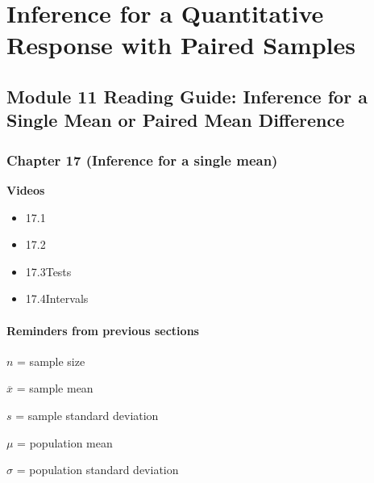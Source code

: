 \documentclass[
]{report}
\providecommand{\tightlist}{%
  \setlength{\itemsep}{0pt}\setlength{\parskip}{0pt}}
\begin{document}
\newpage

\hypertarget{inference-for-a-quantitative-response-with-paired-samples}{%
\chapter{Inference for a Quantitative Response with Paired Samples}\label{inference-for-a-quantitative-response-with-paired-samples}}

\hypertarget{module-11-reading-guide-inference-for-a-single-mean-or-paired-mean-difference}{%
\section{Module 11 Reading Guide: Inference for a Single Mean or Paired Mean Difference}\label{module-11-reading-guide-inference-for-a-single-mean-or-paired-mean-difference}}

\hypertarget{chapter-17-inference-for-a-single-mean}{%
\subsection*{Chapter 17 (Inference for a single mean)}\label{chapter-17-inference-for-a-single-mean}}

\textbf{Videos}

\begin{itemize}
\tightlist
\item
  17.1
\item
  17.2
\item
  17.3Tests
\item
  17.4Intervals
\end{itemize}


\hypertarget{reminders-from-previous-sections-1}{%
\subsubsection*{Reminders from previous sections}\label{reminders-from-previous-sections-1}}

\(n\) = sample size

\(\overline{x}\) = sample mean

\(s\) = sample standard deviation

\(\mu\) = population mean

\(\sigma\) = population standard deviation
\end{document}
